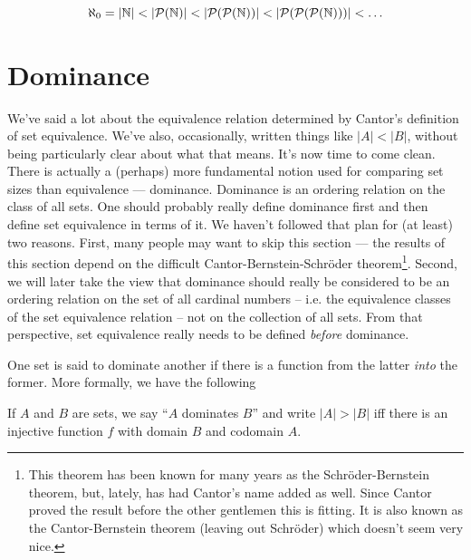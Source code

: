 \[ \aleph_0  = |{\mathbb N}| < |{\mathcal P}({\mathbb N})| < |{\mathcal P}({\mathcal P}({\mathbb N}))| < |{\mathcal P}({\mathcal P}({\mathcal P}({\mathbb N})))| < \ldots \]

\clearpage




\newpage

\section{Dominance}
\label{sec:dominance}

We've said a lot about the equivalence relation 
determined by Cantor's definition
of set equivalence.  We've also, occasionally, written things like 
$|A| < |B|$, without being particularly clear about what that means.  
It's now time to come clean.  There is actually a (perhaps) more fundamental 
notion used for comparing set sizes than equivalence --- dominance. 
Dominance is an ordering relation on the class of all sets.  
One should probably really define dominance first and then
define set equivalence in terms of it.  We haven't followed that plan
for (at least) two reasons.   First, many people may want to skip this 
section --- the results of this section depend on the difficult 
Cantor-Bernstein-Schr\"{o}der theorem\footnote{This theorem has been %
known for many years as the Schr\"{o}der-Bernstein theorem, but, %
lately, has had Cantor's name added as well. Since Cantor proved %
the result before the other gentlemen this is fitting. It is also %
known as the Cantor-Bernstein theorem (leaving out Schr\"{o}der) %
which doesn't seem very nice.}.  Second, we will later take the view that dominance
should really be considered to be an ordering relation on the set of
all cardinal numbers -- i.e. the equivalence classes of the set equivalence
relation -- not on the collection of all sets.  From that perspective,
set equivalence really needs to be defined \emph{before} dominance.

One set is said to dominate another if there is a function from the latter
\emph{into} the former.
More formally, we have the following

\begin{defi}  If $A$ and $B$ are sets, we say ``$A$ dominates $B$'' 
and write $|A| > |B|$ iff there is an injective function $f$ with 
domain $B$ and codomain $A$.
\end{defi}

